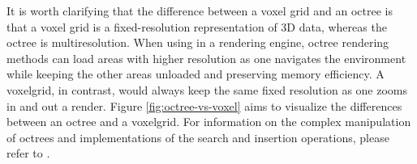 It is worth clarifying that the difference between a voxel grid and an octree is that a voxel grid is a fixed-resolution representation of 3D data, whereas the octree is multiresolution. When using in a rendering engine, octree rendering methods can load areas with higher resolution as one navigates the environment while keeping the other areas unloaded and preserving memory efficiency. A voxelgrid, in contrast, would always keep the same fixed resolution as one zooms in and out a render. Figure \ref{fig:octree-vs-voxel} aims to visualize the differences between an octree and a voxelgrid. For information on the complex manipulation of octrees and implementations of the search and insertion operations, please refer to \textcite{opengenus2021octree, geeksforgeeks2021octree}.


